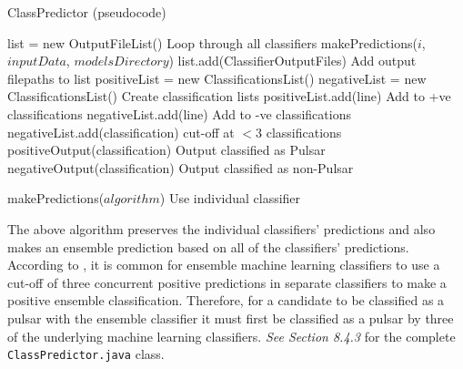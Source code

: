 \documentclass{article}
\begin{document}
\begin{algorithm}[H]
    \caption{ClassPredictor (pseudocode)}
    \begin{algorithmic}[1]
            \State list = new OutputFileList()
                \Comment Loop through all classifiers
                \State makePredictions($i$, $inputData$, $modelsDirectory$)
                \State list.add(ClassifierOutputFiles)
                \Comment Add output filepaths to list
            \EndFor
            \State positiveList = new ClassificationsList()
            \State negativeList = new ClassificationsList()
            \Comment Create classification lists
                        \State positiveList.add(line)
                        \Comment Add to +ve classifications
                    \EndFor
                        \State negativeList.add(line)
                        \Comment Add to -ve classifications
                    \EndFor
                \EndIf
            \EndFor
                    \State negativeList.add(classification)
                    \Comment cut-off at $< 3$ classifications
                \Else
                    \State positiveOutput(classification)
                    \Comment Output classified as Pulsar
                \EndIf
            \EndFor
                \State negativeOutput(classification)
                \Comment Output classified as non-Pulsar
            \EndFor

        \Else 
            \State makePredictions($algorithm$)
            \Comment Use individual classifier
        \EndIf
        
    \end{algorithmic}
\end{algorithm}

The above algorithm preserves the individual classifiers' predictions and also makes an ensemble prediction based on all of the classifiers' predictions. According to \cite{tan}, it is common for ensemble machine learning classifiers to use a cut-off of three concurrent positive predictions in separate classifiers to make a positive ensemble classification. Therefore, for a candidate to be classified as a pulsar with the ensemble classifier it must first be classified as a pulsar by three of the underlying machine learning classifiers. \emph{See Section 8.4.3} for the complete \verb|ClassPredictor.java| class.
\end{document}
